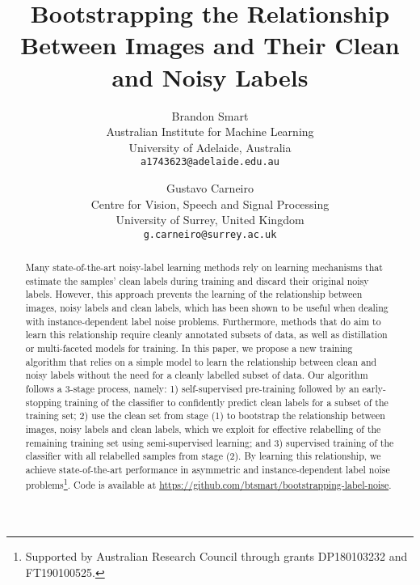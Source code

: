 \documentclass[10pt,twocolumn,letterpaper]{article}
\begin{document}
\title{Bootstrapping the Relationship Between Images and Their Clean and Noisy Labels}

\author{Brandon Smart\\
Australian Institute for Machine Learning\\
University of Adelaide, Australia\\
{\tt\small a1743623@adelaide.edu.au}
\and
Gustavo Carneiro\\
Centre for Vision, Speech and Signal Processing\\
University of Surrey, United Kingdom\\
{\tt\small g.carneiro@surrey.ac.uk}
}

\maketitle


\begin{abstract}
    Many state-of-the-art noisy-label learning methods rely on learning mechanisms that estimate the samples' clean labels during training and discard their original noisy labels.
    However, this approach prevents the learning of the relationship between images, noisy labels and clean labels, which has been shown to be useful when dealing with instance-dependent label noise problems.
    Furthermore, methods that do aim to learn this relationship require cleanly annotated subsets of data, as well as distillation or multi-faceted models for training.
    In this paper, we propose a new training algorithm that relies on a simple model
    to learn the relationship between clean and noisy labels without the need for a cleanly labelled subset of data. 
    Our algorithm follows a 3-stage process, namely: 
    1) self-supervised pre-training followed by an early-stopping training of the classifier to confidently predict clean labels for a subset of the training set;
    2) use the clean set from stage (1) to bootstrap the relationship between images, noisy labels and clean labels, which we exploit for effective relabelling of the remaining training set using semi-supervised learning; and 
    3) supervised training of the classifier with all relabelled samples from stage (2). 
    By learning this relationship, we achieve state-of-the-art performance in asymmetric and instance-dependent label noise problems\footnote{Supported by Australian Research Council through grants DP180103232 and FT190100525.}. Code is available at \url{https://github.com/btsmart/bootstrapping-label-noise}.
\end{abstract}
\end{document}
